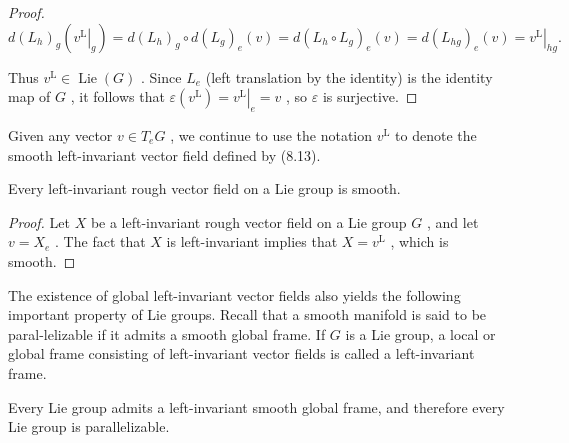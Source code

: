 \begin{proof}
\[
d{\left( {L}_{h}\right) }_{g}\left( {\left. {v}^{\mathrm{L}}\right| }_{g}\right)  = d{\left( {L}_{h}\right) }_{g} \circ  d{\left( {L}_{g}\right) }_{e}\left( v\right)  = d{\left( {L}_{h} \circ  {L}_{g}\right) }_{e}\left( v\right)  = d{\left( {L}_{hg}\right) }_{e}\left( v\right)  = {\left. {v}^{\mathrm{L}}\right| }_{hg}.
\]

Thus ${v}^{\mathrm{L}} \in  \operatorname{Lie}\left( G\right)$ . Since ${L}_{e}$ (left translation by the identity) is the identity map of $G$ , it follows that $\varepsilon \left( {v}^{\mathrm{L}}\right)  = {\left. {v}^{\mathrm{L}}\right| }_{e} = v$ , so $\varepsilon$ is surjective.
\end{proof}

\begin{notation}
\label{not:8-60-extra-6}
\mathlibok
Given any vector $v \in  {T}_{e}G$ , we continue to use the notation ${v}^{\mathrm{L}}$ to denote the smooth left-invariant vector field defined by (8.13).
\end{notation}

\begin{corollary}
\label{cor:8-38}
\leanok
{}
Every left-invariant rough vector field on a Lie group is smooth.
\end{corollary}

\begin{proof}
\leanok
Let $X$ be a left-invariant rough vector field on a Lie group $G$ , and let $v = {X}_{e}$ . The fact that $X$ is left-invariant implies that $X = {v}^{\mathrm{L}}$ , which is smooth.
\end{proof}

\begin{definition}
\label{def:8-60-extra-7}
\leanok
The existence of global left-invariant vector fields also yields the following important property of Lie groups. Recall that a smooth manifold is said to be paral-lelizable if it admits a smooth global frame. If $G$ is a Lie group, a local or global frame consisting of left-invariant vector fields is called a left-invariant frame.
\end{definition}

\begin{corollary}
\label{cor:8-39}
\leanok
{}
Every Lie group admits a left-invariant smooth global frame, and therefore every Lie group is parallelizable.
\end{corollary}

